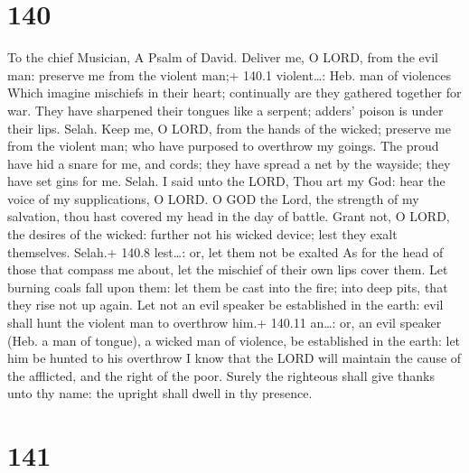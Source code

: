 \hypertarget{section-140}{%
\section{140}\label{section-140}}

To the chief Musician, A Psalm of David.  Deliver me, O
LORD, from the evil man: preserve me from the violent man;+ 140.1
violent\ldots: Heb. man of violences  Which imagine
mischiefs in their heart; continually are they gathered together for
war.  They have sharpened their tongues like a serpent;
adders' poison is under their lips. Selah.  Keep me, O LORD,
from the hands of the wicked; preserve me from the violent man; who have
purposed to overthrow my goings.  The proud have hid a snare
for me, and cords; they have spread a net by the wayside; they have set
gins for me. Selah.  I said unto the LORD, Thou art my God:
hear the voice of my supplications, O LORD.  O GOD the Lord,
the strength of my salvation, thou hast covered my head in the day of
battle.  Grant not, O LORD, the desires of the wicked:
further not his wicked device; lest they exalt themselves. Selah.+ 140.8
lest\ldots: or, let them not be exalted  As for the head of
those that compass me about, let the mischief of their own lips cover
them.  Let burning coals fall upon them: let them be cast
into the fire; into deep pits, that they rise not up again.
 Let not an evil speaker be established in the earth: evil
shall hunt the violent man to overthrow him.+ 140.11 an\ldots: or, an
evil speaker (Heb. a man of tongue), a wicked man of violence, be
established in the earth: let him be hunted to his overthrow
 I know that the LORD will maintain the cause of the
afflicted, and the right of the poor.  Surely the righteous
shall give thanks unto thy name: the upright shall dwell in thy
presence.

\hypertarget{section-141}{%
\section{141}\label{section-141}}

